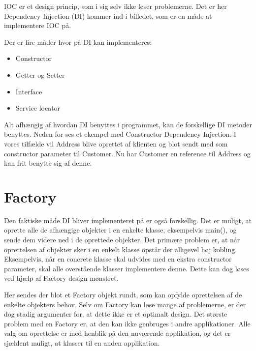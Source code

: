 IOC er et design princip, som i sig selv ikke løser problemerne. Det er her Dependency Injection (DI) kommer ind i billedet, som er en måde at implementere IOC på. 


Der er fire måder hvor på DI kan implementeres: 

\begin{itemize}
	\item Constructor
	\item Getter og Setter
	\item Interface
	\item Service locator
\end{itemize}

Alt afhængig af hvordan DI benyttes i programmet, kan de forskellige DI metoder benyttes. Neden for ses et ekempel med Constructor Dependency Injection. I vores tilfælde vil Address blive oprettet af klienten og blot sendt med som constructor parameter til Customer. Nu har Customer en reference til Address og kan frit benytte sig af denne.



\section{Factory}

Den faktiske måde DI bliver implementeret på er også forskellig. Det er muligt, at oprette alle de afhængige objekter i en enkelte klasse, eksempelvis main(), og sende dem videre ned i de oprettede objekter. Det primære problem er, at når oprettelsen af objekter sker i en enkelt klasse opstår der alligevel høj kobling. Eksempelvis, når en concrete klasse skal udvides med en ekstra constructor parameter, skal alle overstående klasser implementere denne. Dette kan dog løses ved hjælp af Factory design mønstret. 


Her sendes der blot et Factory objekt rundt, som kan opfylde oprettelsen af de enkelte objekters behov. Selv om Factory kan løse mange af problemerne, er der dog stadig argumenter for, at dette ikke er et optimalt design. Det største problem med en Factory er, at den kan ikke genbruges i andre applikationer. Alle valg om oprettelse er med henblik på den nuværende applikation, og det er sjældent muligt, at klasser til en anden applikation. 

